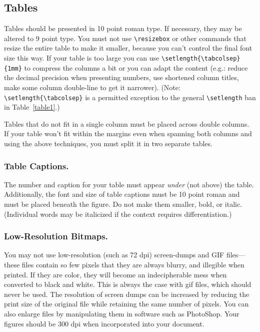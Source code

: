 \subsection{Tables}

Tables should be presented in 10 point roman type. If necessary, they may be altered to 9 point type. You must not use \texttt{\textbackslash resizebox} or other commands that resize the entire table to make it smaller, because you can't control the final font size this way.
If your table is too large you can use \texttt{\textbackslash setlength\{\textbackslash tabcolsep\}\{1mm\}} to compress the columns a bit or you can adapt the content (e.g.: reduce the decimal precision when presenting numbers, use shortened column titles, make some column double-line to get it narrower). (Note: \texttt{\textbackslash setlength\{\textbackslash tabcolsep\}} is a permitted exception to the general \texttt{\textbackslash setlength} ban in Table~\ref{table1}.)

Tables that do not fit in a single column must be placed across double columns. If your table won't fit within the margins even when spanning both columns and using the above techniques, you must split it in two separate tables.

\subsubsection {Table Captions.} The number and caption for your table must appear \textit{under} (not above) the table.  Additionally, the font and size of table captions must be 10 point roman and must be placed beneath the figure. Do not make them smaller, bold, or italic. (Individual words may be italicized if the context requires differentiation.)



\subsubsection{Low-Resolution Bitmaps.}
You may not use low-resolution (such as 72 dpi) screen-dumps and GIF files---these files contain so few pixels that they are always blurry, and illegible when printed. If they are color, they will become an indecipherable mess when converted to black and white. This is always the case with gif files, which should never be used. The resolution of screen dumps can be increased by reducing the print size of the original file while retaining the same number of pixels. You can also enlarge files by manipulating them in software such as PhotoShop. Your figures should be 300 dpi when incorporated into your document.

